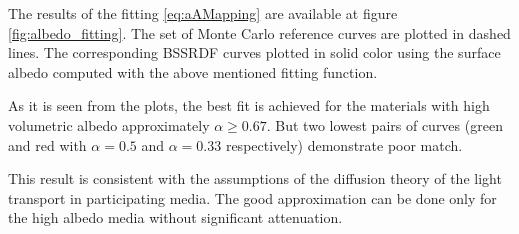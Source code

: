 The results of the fitting \ref{eq:aAMapping} are available at figure \ref{fig:albedo_fitting}. The
set of Monte Carlo reference curves are plotted in dashed lines. The corresponding BSSRDF curves
plotted in solid color using the surface albedo computed with the above mentioned fitting function.

As it is seen from the plots, the best fit is achieved for the materials with high volumetric
albedo approximately $\alpha\geq0.67$. But two lowest pairs of curves (green and red with
$\alpha=0.5$ and $\alpha=0.33$ respectively) demonstrate poor match.

This result is consistent with the assumptions of the diffusion theory of
the light transport in participating media. The good approximation can be done only for the high
albedo media without significant attenuation.